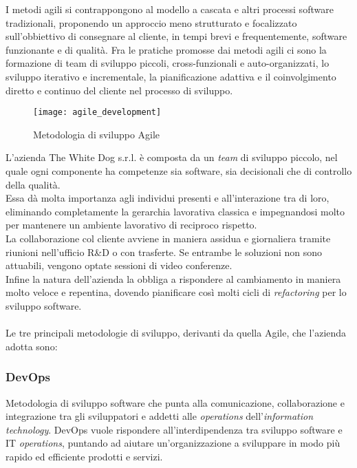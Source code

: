 I metodi agili si contrappongono al modello a cascata e altri processi software tradizionali, proponendo un approccio meno strutturato e focalizzato sull'obbiettivo di consegnare al cliente, in tempi brevi e frequentemente, software funzionante e di qualità. Fra le pratiche promosse dai metodi agili ci sono la formazione di team di sviluppo piccoli, cross-funzionali e auto-organizzati, lo sviluppo iterativo e incrementale, la pianificazione adattiva e il coinvolgimento diretto e continuo del cliente nel processo di sviluppo. 

\label{Metodologia Agile}
\begin{figure}[ht]
	\begin{center}
		\texttt{[image: agile\_development]}
		\caption{Metodologia di sviluppo Agile}
	\end{center}
\end{figure}
\FloatBarrier

L'azienda The White Dog s.r.l. è composta da un \textit{team} di sviluppo piccolo, nel quale ogni componente ha competenze sia software, sia decisionali che di controllo della qualità. \\ 
Essa dà molta importanza agli individui presenti e all'interazione tra di loro, eliminando completamente la gerarchia lavorativa classica e impegnandosi molto per mantenere un ambiente lavorativo di reciproco rispetto. \\
La collaborazione col cliente avviene in maniera assidua e giornaliera tramite riunioni nell'ufficio R\&D o con trasferte. Se entrambe le soluzioni non sono attuabili, vengono optate sessioni di video conferenze. \\
Infine la natura dell'azienda la obbliga a rispondere al cambiamento in maniera molto veloce e repentina, dovendo pianificare così molti cicli di \textit{refactoring} per lo sviluppo software. \\ \\

Le tre principali metodologie di sviluppo, derivanti da quella Agile, che l'azienda adotta sono:

\subsubsection{DevOps}

Metodologia di sviluppo software che punta alla comunicazione, collaborazione e integrazione tra gli sviluppatori e addetti alle \textit{operations} dell'\textit{information technology}. DevOps vuole rispondere all'interdipendenza tra sviluppo software e IT \textit{operations}, puntando ad aiutare un'organizzazione a sviluppare in modo più rapido ed efficiente prodotti e servizi.

